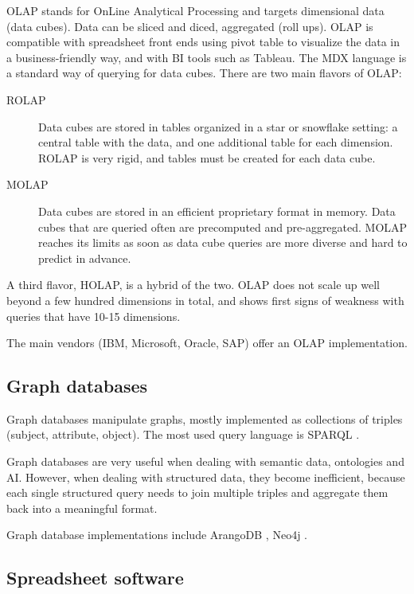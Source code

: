 \documentclass{acm_proc_article-sp}
\begin{document}
OLAP \cite{Codd1993} stands for OnLine Analytical Processing and targets dimensional data (data cubes). Data can be sliced and diced, aggregated (roll ups). OLAP is compatible with spreadsheet front ends using pivot table to visualize the data in a business-friendly way, and with BI tools such as Tableau. The MDX language \cite{Nolan1999} is a standard way of querying for data cubes. There are two main flavors of OLAP:
\begin{description}
\item[ROLAP] Data cubes are stored in tables organized in a star or snowflake setting: a central table with the data, and one additional table for each dimension. ROLAP is very rigid, and tables must be created for each data cube.
\item[MOLAP] Data cubes are stored in an efficient proprietary format in memory. Data cubes that are queried often are precomputed and pre-aggregated. MOLAP reaches its limits as soon as data cube queries are more diverse and hard to predict in advance.
\end{description}

A third flavor, HOLAP, is a hybrid of the two. OLAP does not scale up well beyond a few hundred dimensions in total, and shows first signs of weakness with queries that have 10-15 dimensions.

The main vendors (IBM, Microsoft, Oracle, SAP) offer an OLAP implementation.

\subsection{Graph databases}

Graph databases manipulate graphs, mostly implemented as collections of triples (subject, attribute, object). The most used query language is SPARQL \cite{SPARQL}.

Graph databases are very useful when dealing with semantic data, ontologies and AI. However, when dealing with structured data, they become inefficient, because each single structured query needs to join multiple triples and aggregate them back into a meaningful format.

Graph database implementations include ArangoDB \cite{ArangoDB}, Neo4j \cite{Neo4j}.

\subsection{Spreadsheet software}
\end{document}
